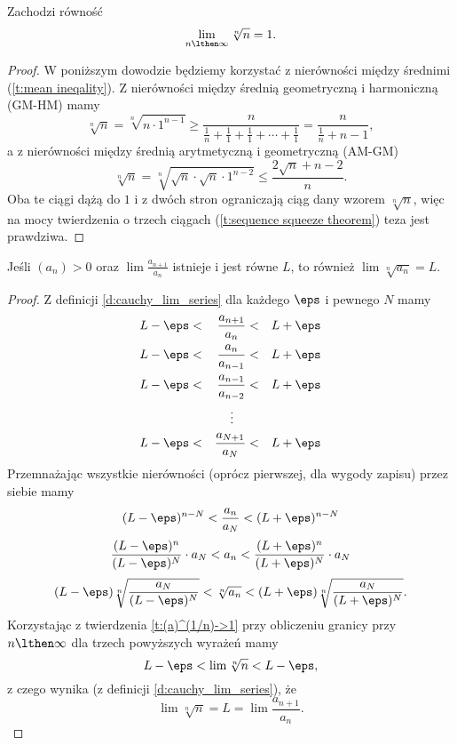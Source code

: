 \begin{theorem}
    Zachodzi równość
    \[ \lim_{n \lthen \infty}\sqrt[n]{n} = 1. \]
\end{theorem}
\begin{proof}
    W poniższym dowodzie będziemy korzystać z nierówności między średnimi (\ref{t:mean ineqality}). Z nierówności między średnią geometryczną i harmoniczną (GM-HM) mamy
    \[ \sqrt[n]{n} = \sqrt[n]{n \cdot 1^{n-1}} \geq \frac{n}{\frac{1}{n} + \frac{1}{1} + \frac{1}{1} + \cdots + \frac{1}{1}} = \frac{n}{\frac{1}{n} + n - 1}, \]
    a z nierówności między średnią arytmetyczną i geometryczną (AM-GM)
    \[ \sqrt[n]{n} = \sqrt[n]{\sqrt{n} \cdot \sqrt{n} \cdot 1^{n-2}} \leq \frac{2\sqrt{n} + n -2}{n}. \]
    Oba te ciągi dążą do $1$ i z dwóch stron ograniczają ciąg dany wzorem $\sqrt[n]{n}$, więc na mocy twierdzenia o trzech ciągach (\ref{t:sequence squeeze theorem}) teza jest prawdziwa.
\end{proof}

\begin{theorem}
    \label{t:lim an/a_n+1 = lim a_n^(1/n)}
    Jeśli $(a_n) > 0$ oraz $\lim\frac{a_{n+1}}{a_n}$ istnieje i jest równe $L$, to również $\lim \sqrt[n]{a_n} = L$.
\end{theorem}
\begin{proof}
    Z definicji \ref{d:cauchy_lim_series} dla każdego $\eps$ i pewnego $N$ mamy
    $$\begin{aligned}
        L - \eps &<& \frac{a_{n+1}}{a_n} &<& L + \eps \\
        L - \eps &<& \frac{a_n}{a_{n-1}} &<& L + \eps \\
        L - \eps &<& \frac{a_{n-1}}{a_{n-2}} &<& L + \eps \\
                 & & \vdots\quad  \\
        L - \eps &<& \frac{a_{N+1}}{a_N} &<& L + \eps \\
    \end{aligned}$$
    Przemnażając wszystkie nierówności (oprócz pierwszej, dla wygody zapisu) przez siebie mamy
    \[ (L - \eps)^{n-N} < \frac{a_n}{a_N} < (L + \eps)^{n-N} \]
    \[ \frac{(L - \eps)^n}{(L - \eps)^{N}} \cdot a_N < a_n < \frac{(L + \eps)^n}{(L + \eps)^{N}} \cdot a_N \]
    \[ (L - \eps)\sqrt[n]{\frac{a_N}{(L - \eps)^{N}}} < \sqrt[n]{a_n} < (L + \eps)\sqrt[n]{\frac{a_N}{(L + \eps)^{N}}}. \]
    Korzystając z twierdzenia \ref{t:(a)^(1/n)->1} przy obliczeniu granicy przy $n \lthen \infty$ dla trzech powyższych wyrażeń mamy
    \[ L - \eps < \lim\sqrt[n]{n} < L - \eps, \]
    z czego wynika (z definicji \ref{d:cauchy_lim_series}), że
    \[ \lim\sqrt[n]{n} = L = \lim\frac{a_{n+1}}{a_n}. \]
\end{proof}

